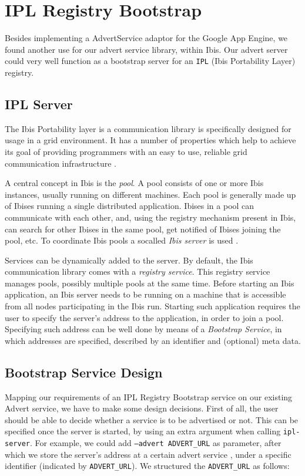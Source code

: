 \section{IPL Registry Bootstrap}
\label{ipl}
Besides implementing a AdvertService adaptor for the Google App Engine, we
found another use for our advert service library, within Ibis. Our advert
server could very well function as a bootstrap server for an \texttt{IPL} (Ibis
Portability Layer) \cite{ipl-www} registry.

\subsection{IPL Server}
The Ibis Portability layer is a communication library is specifically
designed for usage in a grid environment. It has a number of properties which
help to achieve its goal of providing programmers with an easy to use, reliable
grid communication infrastructure \cite{ipl-www}.

A central concept in Ibis is the \emph{pool}. A pool consists of one or more Ibis
instances, usually running on different machines. Each pool is generally made up
of Ibises running a single distributed application. Ibises in a pool can
communicate with each other, and, using the registry mechanism present in Ibis,
can search for other Ibises in the same pool, get notified of Ibises joining the
pool, etc. To coordinate Ibis pools a socalled \emph{Ibis server} is used
\cite{ipl-usersguide}.

Services can be dynamically added to the server. By default, the Ibis
communication library comes with a \emph{registry service}. This registry
service manages pools, possibly multiple pools at the same time. Before starting
an Ibis application, an Ibis server needs to be running on a machine that is
accessible from all nodes participating in the Ibis run. Starting such
application requires the user to specify the server's address to the
application, in order to join a pool. Specifying such address can be well done
by means of a \emph{Bootstrap Service}, in which addresses are specified,
described by an identifier and (optional) meta data.

\subsection{Bootstrap Service Design}
Mapping our requirements of an IPL Registry Bootstrap service on our existing
Advert service, we have to make some design decisions. First of all, the user
should be able to decide whether a service is to be advertised or not. This can
be specified once the server is started, by using an extra argument when calling
\texttt{ipl-server}. For example, we could add \texttt{--advert ADVERT\_URL} as
parameter, after which we store the server's address at a certain advert service
, under a specific identifier (indicated by \texttt{ADVERT\_URL}). We structured
the \texttt{ADVERT\_URL} as follows:

